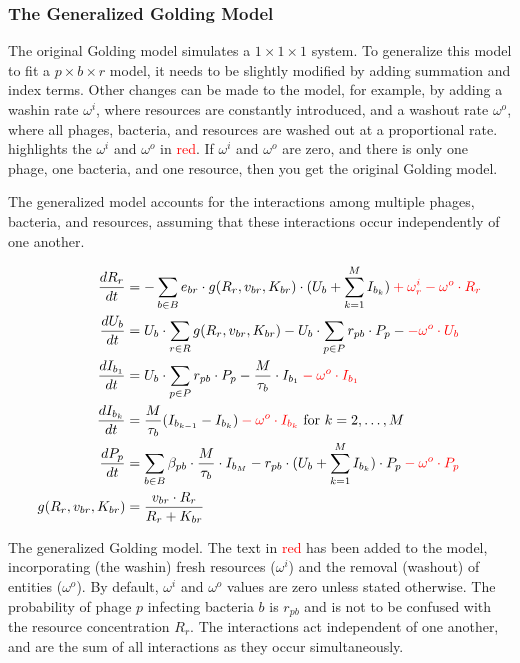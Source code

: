 \subsubsection{The Generalized Golding Model}
\label{sec:adapted_golding_model}
The original Golding model simulates a $1\times 1 \times 1$ system. 
To generalize this model to fit a $p \times b \times r$ model, it needs to be slightly modified by adding summation and index terms. 
Other changes can be made to the model, for example, by adding a washin rate $\omega^{i}$, where resources are constantly introduced, and a washout rate $\omega^{o}$, where all phages, bacteria, and resources are washed out at a proportional rate. 
 highlights the $\omega^i$ and $\omega^o$ in \textcolor{red}{red}. 
If $\omega^i$ and $\omega^o$ are zero, and there is only one phage, one bacteria, and one resource, then you get the original Golding model. 

The generalized model accounts for the interactions among multiple phages, bacteria, and resources, assuming that these interactions occur independently of one another. 

\begin{eqfloat}
    \begin{align}
        \frac{dR_r}{dt} &= -\sum_{b \in B} e_{b r} \cdot g(R_r, v_{b r}, K_{b r})\cdot (U_b + \sum_{k=1}^{M} I_{b_k}) \mathcolor{red}{+ \omega^i_r -\omega^o \cdot R_r}\\
        \frac{dU_b}{dt} &= U_b \cdot \sum_{r \in R} g(R_r, v_{b r}, K_{b r}) - U_b \cdot \sum_{p \in P} r_{p b} \cdot P_p -\mathcolor{red}{-\omega^o \cdot U_b}\\
        \frac{dI_{b_1}}{dt} &= U_b \cdot \sum_{p \in P}r_{p b} \cdot P_p - \frac{M}{\tau_b}\cdot I_{b_1} \mathcolor{red}{-\omega^o \cdot I_{b_1}}\\
        \frac{dI_{b_k}}{dt} &= \frac{M}{\tau_b}(I_{b_{k-1}}-I_{b_k}) \mathcolor{red}{-\omega^o \cdot I_{b_k}}\text{ for } k=2, \dots, M \\
        \frac{dP_p}{dt} &= \sum_{b\in B}\beta_{p b}\cdot\frac{M}{\tau_b} \cdot I_{b_M} - r_{p b}\cdot(U_b + \sum_{k=1}^{M} I_{b_k})\cdot P_p \mathcolor{red}{-\omega^o \cdot P_p}\\
        g(R_r, v_{b r}, K_{b r}) &= \frac{v_{b r} \cdot R_r}{R_r + K_{b r}}
        \label{eq:adapted_golding_model}
    \end{align} 
    \caption{
        The generalized Golding model. 
        The text in \textcolor{red}{red} has been added to the model, incorporating (the washin) fresh resources ($\omega^i$) and the removal (washout) of entities ($\omega^o$). 
        By default, $\omega^i$ and $\omega^o$ values are zero unless stated otherwise.
        The probability of phage $p$ infecting bacteria $b$ is $r_{pb}$ and is not to be confused with the resource concentration $R_r$. 
        The interactions act independent of one another, and are the sum of all interactions as they occur simultaneously. 
    }
\end{eqfloat}

